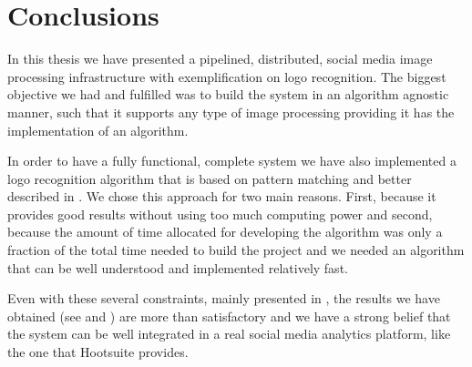 \chapter{Conclusions}

In this thesis we have presented a pipelined, distributed, social media image
processing infrastructure with exemplification on logo recognition. The
biggest objective we had and fulfilled was to build the system in an
algorithm agnostic manner, such that it supports any type of image processing
providing it has the implementation of an algorithm.

In order to have a fully functional, complete system we have also implemented
a logo recognition algorithm that is based on pattern matching and better
described in . We chose this
approach for two main reasons. First, because it provides good results without
using too much computing power and second, because the amount of time
allocated for developing the algorithm was only a fraction of the total
time needed to build the project and we needed an algorithm that can be well
understood and implemented relatively fast.

Even with these several constraints, mainly presented in
, the results we have obtained (see  and
) are more than satisfactory and
we have a strong belief that the system can be well integrated in a real social media
analytics platform, like the one that Hootsuite provides.
